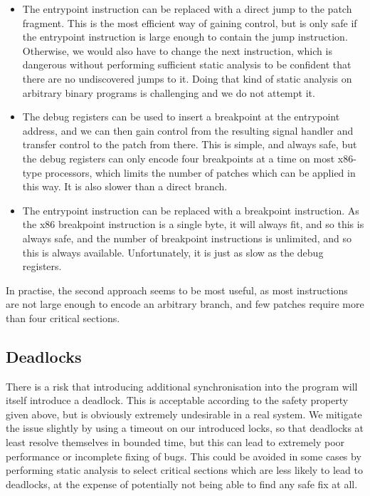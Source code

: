 \documentclass[10pt,a4paper,twocolumn]{article}
\begin{document}
\begin{itemize}
\item The entrypoint instruction can be replaced with a direct jump to
  the patch fragment.  This is the most efficient way of gaining
  control, but is only safe if the entrypoint instruction is large
  enough to contain the jump instruction.  Otherwise, we would also
  have to change the next instruction, which is dangerous without
  performing sufficient static analysis to be confident that there are
  no undiscovered jumps to it.  Doing that kind of static analysis on
  arbitrary binary programs is challenging and we do not attempt it.

\item The debug registers\needCite{} can be used to insert a
  breakpoint at the entrypoint address, and we can then gain control
  from the resulting signal handler and transfer control to the patch
  from there.  This is simple, and always safe, but the debug
  registers can only encode four breakpoints at a time on most
  x86-type processors, which limits the number of patches which can be
  applied in this way.  It is also slower than a direct branch.

\item The entrypoint instruction can be replaced with a breakpoint
  instruction.  As the x86 breakpoint instruction is a single byte, it
  will always fit, and so this is always safe, and the number of
  breakpoint instructions is unlimited, and so this is always
  available.  Unfortunately, it is just as slow as the debug
  registers.
\end{itemize}

In practise, the second approach seems to be most useful, as most
instructions are not large enough to encode an arbitrary branch, and
few patches require more than four critical sections.

\subsection{Deadlocks}

There is a risk that introducing additional synchronisation into the
program will itself introduce a deadlock.  This is acceptable
according to the safety property given above, but is obviously
extremely undesirable in a real system.  We mitigate the issue
slightly by using a timeout on our introduced locks, so that deadlocks
at least resolve themselves in bounded time, but this can lead to
extremely poor performance or incomplete fixing of bugs.  This could
be avoided in some cases by performing static analysis to select
critical sections which are less likely to lead to deadlocks, at the
expense of potentially not being able to find any safe fix at all.
\end{document}
